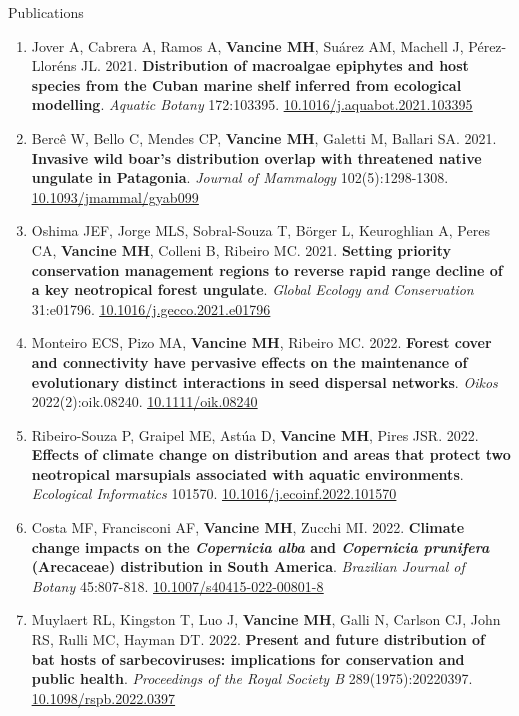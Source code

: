 \documentclass{resume}
\begin{document}
\begin{rSection}{Publications}
\begin{enumerate}
\item Jover A, Cabrera A, Ramos A, {\bf Vancine MH}, Suárez AM, Machell J, Pérez-Lloréns JL. 2021. {\bf Distribution of macroalgae epiphytes and host species from the Cuban marine shelf inferred from ecological modelling}. {\it Aquatic Botany} 172:103395. \href{https://doi.org/10.1016/j.aquabot.2021.103395}{\underline{10.1016/j.aquabot.2021.103395}}

\item Bercê W, Bello C, Mendes CP, {\bf Vancine MH}, Galetti M, Ballari SA. 2021. {\bf Invasive wild boar’s distribution overlap with threatened native ungulate in Patagonia}. {\it Journal of Mammalogy} 102(5):1298-1308. \href{https://doi.org/10.1093/jmammal/gyab099}{\underline{10.1093/jmammal/gyab099}}

\item Oshima JEF, Jorge MLS, Sobral-Souza T, Börger L, Keuroghlian A, Peres CA, {\bf Vancine MH}, Colleni B, Ribeiro MC. 2021. {\bf Setting priority conservation management regions to reverse rapid range decline of a key neotropical forest ungulate}. {\it Global Ecology and Conservation} 31:e01796. \href{https://doi.org/10.1016/j.gecco.2021.e01796}{\underline{10.1016/j.gecco.2021.e01796}}

\item Monteiro ECS, Pizo MA, {\bf Vancine MH}, Ribeiro MC. 2022. {\bf Forest cover and connectivity have pervasive effects on the maintenance of evolutionary distinct interactions in seed dispersal networks}. {\it Oikos} 2022(2):oik.08240. \href{https://doi.org/10.1111/oik.08240}{\underline{10.1111/oik.08240}}

\item Ribeiro-Souza P, Graipel ME, Astúa D, {\bf Vancine MH}, Pires JSR. 2022. {\bf Effects of climate change on distribution and areas that protect two neotropical marsupials associated with aquatic environments}. {\it Ecological Informatics} 101570. \href{https://doi.org/10.1016/j.ecoinf.2022.101570}{\underline{10.1016/j.ecoinf.2022.101570}}

\item Costa MF, Francisconi AF, {\bf Vancine MH}, Zucchi MI. 2022. {\bf Climate change impacts on the {\it Copernicia alba} and {\it Copernicia prunifera} (Arecaceae) distribution in South America}. {\it Brazilian Journal of Botany} 45:807-818. \href{https://doi.org/10.1007/s40415-022-00801-8}{\underline{10.1007/s40415-022-00801-8}}

\item Muylaert RL, Kingston T, Luo J, {\bf Vancine MH}, Galli N, Carlson CJ, John RS, Rulli MC, Hayman DT. 2022. {\bf Present and future distribution of bat hosts of sarbecoviruses: implications for conservation and public health}. {\it Proceedings of the Royal Society B} 289(1975):20220397. \href{https://doi.org/10.1098/rspb.2022.0397}{\underline{10.1098/rspb.2022.0397}}


\end{enumerate}
\end{rSection}
\end{document}
